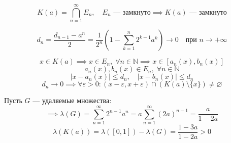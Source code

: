 \documentclass[12pt, a4paper]{article}
\begin{document}
\[
K(a) = \bigcap_{n=1}^{\infty} E_n, \quad E_n \text{ --- замкнуто} \implies K(a) \text{ --- замкнуто}
\]

\[
d_n = \frac{d_{n-1} - a^n}{2} = \frac{1}{2^n} \left( 1 - \sum_{k=1}^{n} 2^{k-1} a^k \right) \to 0 \quad \text{при } n \to +\infty
\]

\[
x \in K(a) \implies x \in E_n, \; \forall n \in \mathbb{N} \implies x \in [a_n(x), b_n(x)]
\]
\[
a_n(x), b_n(x) \in E_n, \; \forall n \in \mathbb{N}
\]
\[
|x - a_n(x)| \le d_n, \quad |x - b_n(x)| \le d_n
\]
\[
d_n \to 0 \implies \forall \varepsilon > 0 : (x - \varepsilon, x + \varepsilon) \cap (K(a) \setminus \{x\}) \neq \varnothing
\]

Пусть $G$ --- удаляемые множества:
\[
\implies \lambda(G) = \sum_{n=1}^{\infty} 2^{n-1} a^n = a \sum_{n=1}^{\infty} (2a)^{n-1} = \frac{a}{1 - 2a}
\]
\[
\lambda(K(a)) = \lambda([0, 1]) - \lambda(G) = \frac{1 - 3a}{1 - 2a} > 0
\]
\end{document}
